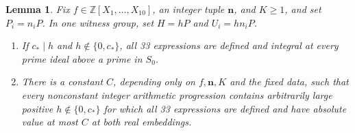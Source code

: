 \documentclass[11pt,reqno]{amsart}
\newtheorem{lemma}[theorem]{Lemma}
\theoremstyle{definition}
\numberwithin{equation}{section}
\newcommand{\Z}{\mathbb Z}
\begin{document}
\begin{lemma}\label{lem:uniformbounds}
Fix $f\in\Z[X_1,\ldots,X_{10}]$, an integer tuple $\mathbf n$, and $K\ge1$, and set $P_i=n_iP$. In one witness group, set $H=hP$ and $U_i=hn_iP$.
\begin{enumerate}
\item If $c_\ast\mid h$ and $h\notin\{0,c_\ast\}$, all 33 expressions are defined and integral at every prime ideal above a prime in $S_0$.
\item There is a constant $C$, depending only on $f,\mathbf n,K$ and the fixed data, such that every nonconstant integer arithmetic progression contains arbitrarily large positive $h\notin\{0,c_\ast\}$ for which all 33 expressions are defined and have absolute value at most $C$ at both real embeddings.
\end{enumerate}
\end{lemma}
\end{document}
